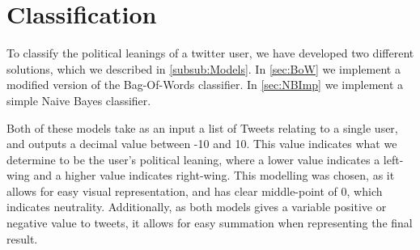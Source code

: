 \chapter{Classification}\label{cha:classification}
To classify the political leanings of a twitter user, we have developed
two different solutions, which we described in \autoref{subsub:Models}. In
\autoref{sec:BoW} we implement a modified version of the Bag-Of-Words
classifier. In \autoref{sec:NBImp} we implement a simple Naive Bayes
classifier.\nl

Both of these models take as an input a list of Tweets relating to a single
user, and outputs a decimal value between -10 and 10. This value indicates
what we determine to be the user's political leaning, where a lower value
indicates a left-wing and a higher value indicates right-wing. This modelling
was chosen, as it allows for easy visual representation, and has clear
middle-point of 0, which indicates neutrality. Additionally, as both
models gives a variable positive or negative value to tweets, it allows for easy
summation when representing the final result.
